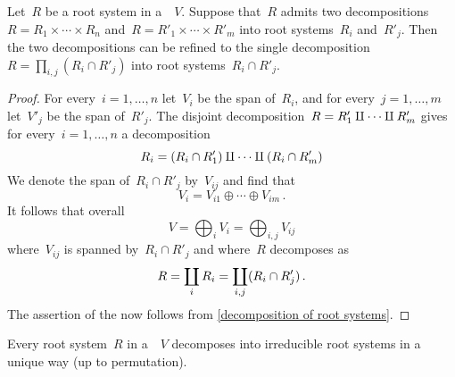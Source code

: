 \begin{lemma}
  \label{common refinement of root system decomposition}
  Let~$R$ be a root system in a~{\vectorspace{$\kf$}}~$V$.
  Suppose that~$R$ admits two decompositions~$R = R_1 \times \dotsb \times R_n$ and~$R = R'_1 \times \dotsb \times R'_m$ into root systems~$R_i$ and~$R'_j$.
  Then the two decompositions can be refined to the single decomposition~$R = \prod_{i,j} (R_i \cap R'_j)$ into root systems~$R_i \cap R'_j$.
\end{lemma}


\begin{proof}
  For every~$i = 1, \dotsc, n$ let~$V_i$ be the span of~$R_i$, and for every~$j = 1, \dotsc, m$ let~$V'_j$ be the span of~$R'_j$.
  The disjoint decomposition~$R = R'_1 \amalg \dotsb \amalg R'_m$ gives for every~$i = 1, \dotsc, n$ a decomposition
  \[
    R_i
    =
    (R_i \cap R'_1) \amalg \dotsb \amalg (R_i \cap R'_m)
  \]
  We denote the span of~$R_i \cap R'_j$ by~$V_{ij}$ and find that
  \[
    V_i
    =
    V_{i1} \oplus \dotsb \oplus V_{im} \,.
  \]
  It follows that overall
  \[
    V
    =
    \bigoplus_i V_i
    =
    \bigoplus_{i,j} V_{ij}
  \]
  where~$V_{ij}$ is spanned by~$R_i \cap R'_j$ and where~$R$ decomposes as
  \[
    R
    =
    \coprod_i R_i
    =
    \coprod_{i,j} (R_i \cap R'_j) \,.
  \]
  The assertion of the  now follows from \cref{decomposition of root systems}.
\end{proof}


\begin{corollary}
  \label{irreducible decomposition of root systems}
  Every root system~$R$ in a~{\vectorspace{$\kf$}}~$V$ decomposes into irreducible root systems in a unique way (up to permutation).
\end{corollary}


